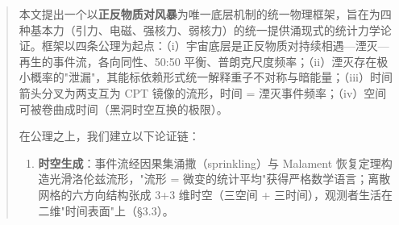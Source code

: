 \documentclass[12pt]{article}
\begin{document}
\begin{abstract}

本文提出一个以\textbf{正反物质对风暴}为唯一底层机制的统一物理框架，旨在为四种基本力（引力、电磁、强核力、弱核力）的统一提供涌现式的统计力学论证。框架以四条公理为起点：（i）宇宙底层是正反物质对持续相遇---湮灭---再生的事件流，各向同性、50:50 平衡、普朗克尺度频率；（ii）湮灭存在极小概率的"泄漏"，其能标依赖形式统一解释重子不对称与暗能量；（iii）时间箭头分叉为两支互为 CPT 镜像的流形，时间 = 湮灭事件频率；（iv）空间可被卷曲成时间（黑洞时空互换的极限）。

在公理之上，我们建立以下论证链：

\begin{enumerate}
\item \textbf{时空生成}：事件流经因果集涌撒（sprinkling）与 Malament 恢复定理构造光滑洛伦兹流形，"流形 = 微变的统计平均"获得严格数学语言；离散网格的六方向结构张成 3+3 维时空（三空间 + 三时间），观测者生活在二维"时间表面"上（\S{}3.3）。
\end{enumerate}


\end{abstract}
\end{document}
